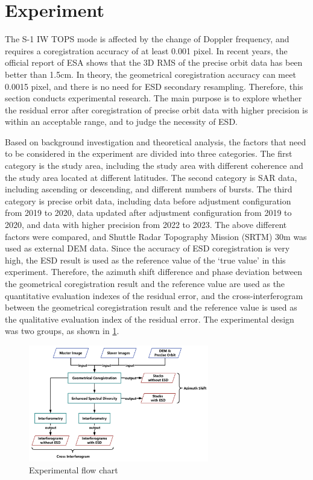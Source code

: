 \documentclass[preprint, authoryear]{elsarticle}
\begin{document}
\section{Experiment}

The S-1 IW TOPS mode is affected by the change of Doppler frequency, and requires a coregistration accuracy of at least 0.001 pixel. In recent years, the official report of ESA shows that the 3D RMS of the precise orbit data has been better than 1.5cm. In theory, the geometrical coregistration accuracy can meet 0.0015 pixel, and there is no need for ESD secondary resampling. Therefore, this section conducts experimental research. The main purpose is to explore whether the residual error after coregistration of precise orbit data with higher precision is within an acceptable range, and to judge the necessity of ESD. \par

Based on background investigation and theoretical analysis, the factors that need to be considered in the experiment are divided into three categories. The first category is the study area, including the study area with different coherence and the study area located at different latitudes. The second category is SAR data, including ascending or descending, and different numbers of bursts. The third category is precise orbit data, including data before adjustment configuration from 2019 to 2020, data updated after adjustment configuration from 2019 to 2020, and data with higher precision from 2022 to 2023. The above different factors were compared, and Shuttle Radar Topography Mission (SRTM) 30m was used as external DEM data. Since the accuracy of ESD coregistration is very high, the ESD result is used as the reference value of the ‘true value’ in this experiment. Therefore, the azimuth shift difference and phase deviation between the geometrical coregistration result and the reference value are used as the quantitative evaluation indexes of the residual error, and the cross-interferogram between the geometrical coregistration result and the reference value is used as the qualitative evaluation index of the residual error. The experimental design was two groups, as shown in \ref{fig_3}. \par

\begin{figure}
	\centering 
	\includegraphics[width=0.7\textwidth]{figure/Experimental flow chart.png}	
	\caption{Experimental flow chart} 
	\label{fig_3}%
\end{figure}
\end{document}
